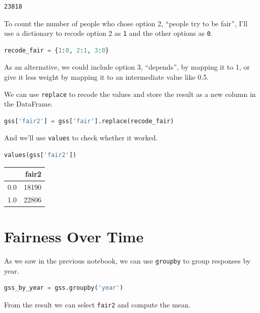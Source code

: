 \begin{lstlisting}[]
23818
\end{lstlisting}

To count the number of people who chose option 2, ``people try to be
fair'', I'll use a dictionary to recode option 2 as
\passthrough{\lstinline!1!} and the other options as
\passthrough{\lstinline!0!}.

\begin{lstlisting}[language=Python]
recode_fair = {1:0, 2:1, 3:0}
\end{lstlisting}

As an alternative, we could include option 3, ``depends'', by mapping it
to 1, or give it less weight by mapping it to an intermediate value like
0.5.

We can use \passthrough{\lstinline!replace!} to recode the values and
store the result as a new column in the DataFrame.

\begin{lstlisting}[language=Python]
gss['fair2'] = gss['fair'].replace(recode_fair)
\end{lstlisting}

And we'll use \passthrough{\lstinline!values!} to check whether it
worked.

\begin{lstlisting}[language=Python]
values(gss['fair2'])
\end{lstlisting}

\begin{tabular}{lr}
\toprule
{} &  fair2 \\
\midrule
0.0 &  18190 \\
1.0 &  22806 \\
\bottomrule
\end{tabular}

\hypertarget{fairness-over-time}{%
\section{Fairness Over Time}\label{fairness-over-time}}

As we saw in the previous notebook, we can use
\passthrough{\lstinline!groupby!} to group responses by year.

\begin{lstlisting}[language=Python]
gss_by_year = gss.groupby('year')
\end{lstlisting}

From the result we can select \passthrough{\lstinline!fair2!} and
compute the mean.

